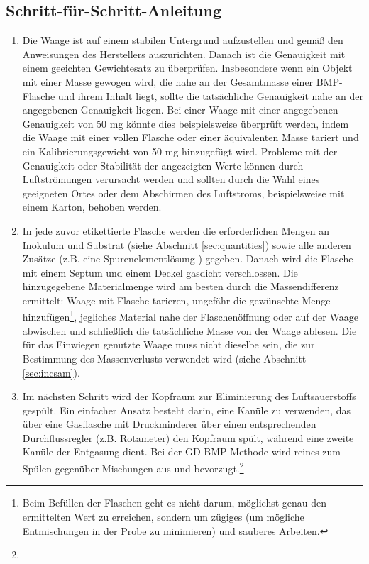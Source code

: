 \documentclass[]{article}
\begin{document}
\subsection{Schritt-für-Schritt-Anleitung}
\label{sec:step-by-step}
\begin{enumerate}
  \item Die Waage ist auf einem stabilen Untergrund aufzustellen und gemäß den Anweisungen des Herstellers auszurichten. Danach ist die Genauigkeit mit einem geeichten Gewichtesatz zu überprüfen.
      Insbesondere wenn ein Objekt mit einer Masse gewogen wird, die nahe an der Gesamtmasse einer BMP-Flasche und ihrem Inhalt liegt, sollte die tatsächliche Genauigkeit nahe an der angegebenen Genauigkeit liegen. Bei einer Waage mit einer angegebenen Genauigkeit von 50 mg könnte dies beispielsweise überprüft werden, indem die Waage mit einer vollen Flasche oder einer äquivalenten Masse tariert und ein Kalibrierungsgewicht von 50 mg hinzugefügt wird.
      Probleme mit der Genauigkeit oder Stabilität der angezeigten Werte können durch Luftströmungen verursacht werden und sollten durch die Wahl eines geeigneten Ortes oder dem Abschirmen des Luftstroms, beispielsweise mit einem Karton, behoben werden.
    \item In jede zuvor etikettierte Flasche werden die erforderlichen Mengen an Inokulum und Substrat (siehe Abschnitt \ref{sec:quantities}) sowie alle anderen Zusätze (z.B. eine Spurenelementlösung \citep{holligerStandardizationBiomethanePotential2016}) gegeben. Danach wird die Flasche mit einem Septum und einem Deckel gasdicht verschlossen.
      Die hinzugegebene Materialmenge wird am besten durch die Massendifferenz ermittelt: Waage mit Flasche tarieren, ungefähr die gewünschte Menge hinzufügen\footnote{Beim Befüllen der Flaschen geht es nicht darum, möglichst genau den ermittelten Wert zu erreichen, sondern um zügiges (um mögliche Entmischungen in der Probe zu minimieren) und sauberes Arbeiten.}, jegliches Material nahe der Flaschenöffnung oder auf der Waage abwischen und schließlich die tatsächliche Masse von der Waage ablesen.
      Die für das Einwiegen genutzte Waage muss nicht dieselbe  sein, die zur Bestimmung des Massenverlusts verwendet wird (siehe Abschnitt \ref{sec:incsam}).
    \item Im nächsten Schritt wird der Kopfraum zur Eliminierung des Luftsauerstoffs gespült.
      Ein einfacher Ansatz besteht darin, eine Kanüle zu verwenden, das über eine Gasflasche mit Druckminderer über einen entsprechenden Durchflussregler (z.B.  Rotameter) den Kopfraum spült, während eine zweite Kanüle der Entgasung dient. Bei der GD-BMP-Methode wird reines  zum Spülen gegenüber Mischungen aus  und  bevorzugt.\footnote{
}
\end{enumerate}
\end{document}
